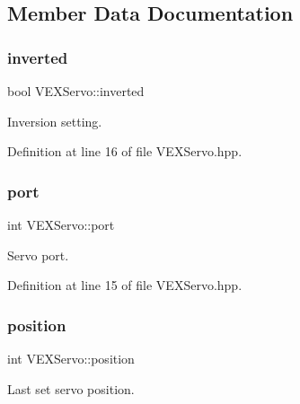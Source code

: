 \subsection{Member Data Documentation}
\mbox{\label{class_v_e_x_servo_a660e5b8a09906d86a4c7b6c7d88042c5}} 
\subsubsection{\texorpdfstring{inverted}{inverted}}
{\footnotesize\ttfamily bool V\+E\+X\+Servo\+::inverted\hspace{0.3cm}{\ttfamily [private]}}



Inversion setting. 



Definition at line 16 of file V\+E\+X\+Servo.\+hpp.

\mbox{\label{class_v_e_x_servo_a34333ff9091be5124f25597c95593291}} 
\subsubsection{\texorpdfstring{port}{port}}
{\footnotesize\ttfamily int V\+E\+X\+Servo\+::port\hspace{0.3cm}{\ttfamily [private]}}



Servo port. 



Definition at line 15 of file V\+E\+X\+Servo.\+hpp.

\mbox{\label{class_v_e_x_servo_aa277013ab5c085b050b9a28f61e11e8b}} 
\subsubsection{\texorpdfstring{position}{position}}
{\footnotesize\ttfamily int V\+E\+X\+Servo\+::position\hspace{0.3cm}{\ttfamily [private]}}



Last set servo position. 



